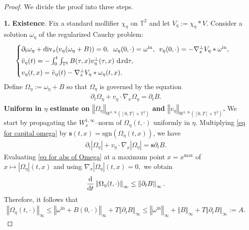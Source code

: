 \documentclass[11pt,reqno]{amsart}
\numberwithin{equation}{section}
\def\dd{{\rm d}}
\begin{document}
\begin{proof}
We divide the proof into three steps.

\smallskip
\textbf{1. }\textbf{Existence}.
Fix a standard mollifier $\chi_{\eta}$ on $\mathbb{T}^{2}$ and let $V_{\eta}:= \chi_{\eta}\ast V$. Consider a solution $\omega_{\eta}$  of the regularized Cauchy problem:  
\begin{align}
\begin{cases}
\partial_{t}\omega_{\eta}+\mathrm{div}_{x}(v_{\eta} (\omega_{\eta}+B))=0, \,\,\, \omega_{\eta}(0,\cdot)=\omega^{\mathrm{in}},\,\,\, v_{\eta}(0,\cdot)=-\nabla_{x}^{\perp}V_{\eta}\ast \omega^{\mathrm{in}}, \\[1mm]
\bar{v}_{\eta}(t)=-\int_{0}^{t}\int_{\mathbb{T}^{2}}B(\tau,x)v_{\eta}^{\perp}(\tau,x)\ \dd x \dd\tau,\\[1mm]
v_{\eta}(t,x)=\bar{v}_{\eta}(t)-\nabla_{x}^{\perp}V_{\eta}\ast \omega_{\eta}(t,x). 
\end{cases}
\label{regularized magnetized}
\end{align}
Define $\Omega_{\eta}:= \omega_{\eta}+B$ so that 
$\Omega_{\eta}$ is governed by the equation  
\begin{align}
\partial_{t}\Omega_{\eta}+v_{\eta}\cdot \nabla_{x}\Omega_{\eta}=\partial_{t}B. \label{eq for capital omega}   \end{align}
\textbf{Uniform in $\eta$ estimate on $\left\Vert \Omega_{\eta}\right\Vert_{W^{1,\infty}([0,T]\times \mathbb{T}^{2})}$ and $\left\Vert v_{\eta}\right\Vert_{W^{1,\infty}([0,T]\times \mathbb{T}^{2})}$.} We start by propagating the $W^{1,\infty}_{x}$--norm of $\Omega_{\eta}(t,\cdot)$ uniformly in $\eta$. 
Multiplying \eqref{eq for capital omega} by $\mathbf{s}(t,x)=\mathrm{sgn}(\Omega_{\eta}(t,x))$, we have
\begin{align}
\partial_{t}\left\vert \Omega_{\eta}\right\vert+v_{\eta}\cdot \nabla_{x}\left\vert \Omega_{\eta}\right\vert =\mathbf{s}\partial_{t}B. \label{eq for abs of Omega} \end{align}
Evaluating \eqref{eq for abs of Omega} at a maximum point $x=x^{\max}$ of $x\mapsto \left\vert \Omega_{\eta}\right\vert(t,x)$ and using $\nabla_{x}\left\vert \Omega_{\eta}\right\vert(t,x)=0,$ 
we obtain 
\begin{align*}
\frac{\dd}{\dd t}\left\Vert \Omega_{\eta}(t,\cdot)\right\Vert_{\infty}\leq \left\Vert \partial_{t}B\right\Vert_{\infty}.      
\end{align*}
Therefore, it follows that  
\begin{align}
\left\Vert \Omega_{\eta}(t,\cdot)\right\Vert_{\infty}\leq \left\Vert \omega^{\mathrm{in}}+B(0,\cdot)\right\Vert_{\infty}+T\left\Vert \partial_{t}B\right\Vert_{\infty}\leq \left\Vert \omega^{\mathrm{in}}\right\Vert_{\infty}+\left\Vert B\right\Vert_{\infty}+T\left\Vert \partial_{t}B\right\Vert_{\infty}:= A.           \label{Def of A}  

\end{align}
\end{proof}
\end{document}
